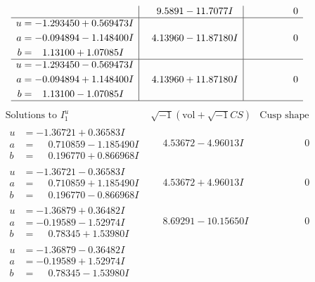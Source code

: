 \documentclass[1p]{elsarticle_modified}
\theoremstyle{definition}
\newcommand{\I}{\sqrt{-1}}
\begin{document}
$$\begin{array}{c|c|c}
 & \phantom{-}9.5891 - 11.7077 I & \phantom{-0.000000 } 0 \\ \hline\begin{aligned}
u &= -1.293450 + 0.569473 I \\
a &= -0.094894 - 1.148400 I \\
b &= \phantom{-}1.13100 + 1.07085 I\end{aligned}
 & \phantom{-}4.13960 - 11.87180 I & \phantom{-0.000000 } 0 \\ \hline\begin{aligned}
u &= -1.293450 - 0.569473 I \\
a &= -0.094894 + 1.148400 I \\
b &= \phantom{-}1.13100 - 1.07085 I\end{aligned}
 & \phantom{-}4.13960 + 11.87180 I & \phantom{-0.000000 } 0\\
 \hline 
 \end{array}$$\newpage$$\begin{array}{c|c|c}  
\text{Solutions to }I^u_{1}& \I (\text{vol} + \sqrt{-1}CS) & \text{Cusp shape}\\
 \hline 
\begin{aligned}
u &= -1.36721 + 0.36583 I \\
a &= \phantom{-}0.710859 - 1.185490 I \\
b &= \phantom{-}0.196770 + 0.866968 I\end{aligned}
 & \phantom{-}4.53672 - 4.96013 I & \phantom{-0.000000 } 0 \\ \hline\begin{aligned}
u &= -1.36721 - 0.36583 I \\
a &= \phantom{-}0.710859 + 1.185490 I \\
b &= \phantom{-}0.196770 - 0.866968 I\end{aligned}
 & \phantom{-}4.53672 + 4.96013 I & \phantom{-0.000000 } 0 \\ \hline\begin{aligned}
u &= -1.36879 + 0.36482 I \\
a &= -0.19589 - 1.52974 I \\
b &= \phantom{-}0.78345 + 1.53980 I\end{aligned}
 & \phantom{-}8.69291 - 10.15650 I & \phantom{-0.000000 } 0 \\ \hline\begin{aligned}
u &= -1.36879 - 0.36482 I \\
a &= -0.19589 + 1.52974 I \\
b &= \phantom{-}0.78345 - 1.53980 I\end{aligned}

\end{array}$$
\end{document}
